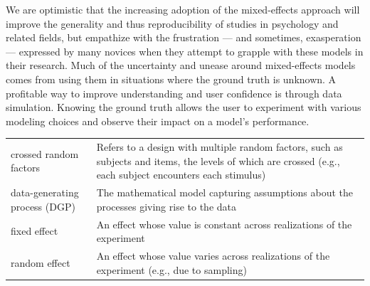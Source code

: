 \documentclass[doc,floatsintext]{apa6}
\begin{document}
We are optimistic that the increasing adoption of the mixed-effects
approach will improve the generality and thus reproducibility of studies
in psychology and related fields, but empathize with the frustration ---
and sometimes, exasperation --- expressed by many novices when they
attempt to grapple with these models in their research. Much of the
uncertainty and unease around mixed-effects models comes from using them
in situations where the ground truth is unknown. A profitable way to
improve understanding and user confidence is through data simulation.
Knowing the ground truth allows the user to experiment with various
modeling choices and observe their impact on a model's performance.

\begin{tcolorbox}[colback=black!5!white,colframe=white!5!black,title=Box 1. Glossary of terms]
\begin{longtable}[]{@{}ll@{}}
\begin{minipage}[t]{0.29\columnwidth}\raggedright
crossed random factors\strut
\end{minipage} & \begin{minipage}[t]{0.65\columnwidth}\raggedright
Refers to a design with multiple random factors, such as subjects and items, the levels of which are crossed (e.g., each subject encounters each stimulus) \strut
\end{minipage}\tabularnewline
\begin{minipage}[t]{0.29\columnwidth}\raggedright
data-generating process (DGP)\strut
\end{minipage} & \begin{minipage}[t]{0.65\columnwidth}\raggedright
The mathematical model capturing assumptions about the processes giving rise to the data\strut
\end{minipage}\tabularnewline
\begin{minipage}[t]{0.29\columnwidth}\raggedright
fixed effect\strut
\end{minipage} & \begin{minipage}[t]{0.65\columnwidth}\raggedright
An effect whose value is constant across realizations of the experiment\strut
\end{minipage}\tabularnewline
\begin{minipage}[t]{0.29\columnwidth}\raggedright
random effect\strut
\end{minipage} & \begin{minipage}[t]{0.65\columnwidth}\raggedright
An effect whose value varies across realizations of the experiment (e.g., due to sampling)\strut

\end{minipage}
\end{longtable}
\end{tcolorbox}
\end{document}
